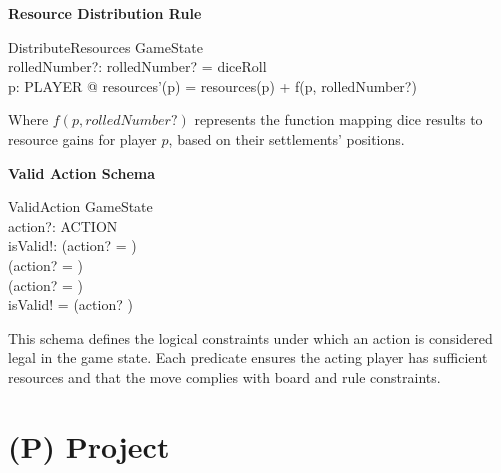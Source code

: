 \documentclass{article}
\begin{document}
\textbf{Resource Distribution Rule}

\begin{schema}{DistributeResources}
    \Delta GameState \\
    rolledNumber?: 
    \where
    rolledNumber? = diceRoll \\
    \forall p: PLAYER @ resources'(p) = resources(p) + f(p, rolledNumber?)
\end{schema}


Where $f(p, rolledNumber?)$ represents the function mapping dice results to resource gains for player $p$, based on their settlements' positions. \newline

\textbf{Valid Action Schema}

\begin{schema}{ValidAction}
    GameState \\
    action?: ACTION \\
    isValid!: 
    \where
    (action? =  \implies {}) \\
    (action? =  \implies {}) \\
    (action? =  \implies {}) \\
    isValid! = (action? \in {})
\end{schema}


This schema defines the logical constraints under which an action is considered legal in the game state.
Each predicate ensures the acting player has sufficient resources and that the move complies with board and rule constraints.

\newpage{}


\section*{(P) Project}\label{sec:srs_project}
\renewcommand{\thesubsection}{P.\arabic{subsection}}
\renewcommand{\theHsubsection}{P.\arabic{subsection}}
\setcounter{subsection}{0}
\end{document}
